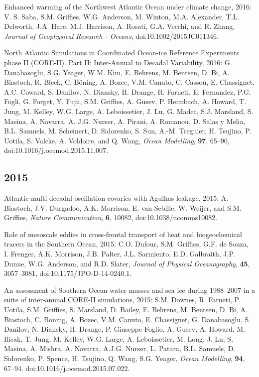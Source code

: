 \begin{etaremune}
\item Enhanced warming of the Northwest Atlantic Ocean under climate  change, 2016: V. S. Saba, S.M. Grif\/f\/ies, W.G. Anderson,  M. Winton, M.A. Alexander, T.L. Delworth, J.A. Hare, M.J. Harrison, A. Rosati, G.A. Vecchi, and R. Zhang, {\it Journal of Geophysical Research - Oceans}, doi:10.1002/2015JC011346.

\item North Atlantic Simulations in Coordinated Ocean-ice Reference  Experiments phase II (CORE-II). Part II: Inter-Annual to Decadal  Variability, 2016: G. Danabasoglu, S.G. Yeager, W.M. Kim,  E. Behrens, M. Bentsen, D. Bi, A. Biastoch, R. Bleck, C. B\"{o}ning,  A. Bozec, V.M. Canuto, C. Cassou, E. Chassignet, A.C. Coward, S. Danilov, N. Diansky, H. Drange, R. Farneti, E. Fernandez, P.G. Fogli, G. Forget, Y. Fujii, S.M. Grif\/f\/ies, A. Gusev, P. Heimbach, A. Howard, T. Jung, M. Kelley, W.G. Large,  A. Leboissetier, J. Lu, G. Madec, S.J. Marsland, S. Masina,  A. Navarra, A. J.G. Nurser, A. Pirani, A. Romanou, D. Salas y Melia, B.L. Samuels, M. Scheinert, D. Sidorenko, S. Sun, A.-M. Treguier, H. Tsujino, P. Uotila, S. Valcke, A. Voldoire, and Q. Wang, {\it Ocean Modelling}, {\bf 97}, 65--90, 
doi:10.1016/j.ocemod.2015.11.007.

\subsection*{\sc \color{Maroon} 2015}

\item Atlantic multi-decadal oscillation covaries with Agulhas leakage, 2015: A. Biastoch, J.V. Durgadoo, A.K. Morrison, E. van Sebille, W. Weijer, and S.M. Grif\/f\/ies, {\it Nature Communication}, {\bf 6}, 10082, doi:10.1038/ncomms10082.

\item Role of mesoscale eddies in cross-frontal transport of heat and biogeochemical tracers in the Southern Ocean, 2015: C.O. Dufour, S.M. Grif\/f\/ies, G.F. de Souza, I. Frenger, A.K. Morrison, J.B. Palter, J.L. Sarmiento, E.D. Galbraith, J.P. Dunne, W.G. Anderson, and R.D. Slater, {\it Journal of Physical Oceanography}, {\bf 45}, 3057--3081,
doi:10.1175/JPO-D-14-0240.1.

\item An assessment of Southern Ocean water masses and sea ice during  1988--2007 in a suite of inter-annual CORE-II simulations, 2015:  S.M. Downes, R. Farneti, P. Uotila, S.M. Grif\/f\/ies,  S. Marsland, D. Bailey, E. Behrens, M. Bentsen, D. Bi, A. Biastoch,  C. B\"oning, A. Bozec, V.M. Canuto, E. Chassignet, G. Danabasoglu,
  S. Danilov, N. Diansky, H. Drange, P. Giuseppe Foglio, A. Gusev,  A. Howard, M. Ilicak, T.  Jung, M. Kelley, W.G. Large,  A. Leboissetier, M. Long, J. Lu, S. Masina, A. Mishra, A. Navarra,  A.J.G. Nurser, L. Patara, B.L. Samuels, D. Sidorenko, P. Spence,
  H. Tsujino, Q. Wang, S.G. Yeager, {\it Ocean Modelling}, {\bf 94},  67--94.  doi:10.1016/j.ocemod.2015.07.022.



\end{etaremune}
